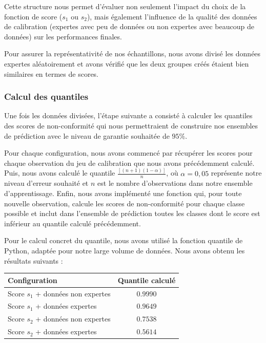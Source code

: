 \documentclass[a4paper,12pt]{article}
\begin{document}
\vspace{0.2cm}

Cette structure nous permet d'évaluer non seulement l'impact du choix de la fonction de score ($s_1$ ou $s_2$), mais également l'influence de la qualité des données de calibration (expertes avec peu de données ou non expertes avec beaucoup de données) sur les performances finales.

\vspace{0.2cm}

Pour assurer la représentativité de nos échantillons, nous avons divisé les données expertes aléatoirement et avons vérifié que les deux groupes créés étaient bien similaires en termes de scores.

\subsubsection{Calcul des quantiles}

Une fois les données divisées, l'étape suivante a consisté à calculer les quantiles des scores de non-conformité qui nous permettraient de construire nos ensembles de prédiction avec le niveau de garantie souhaitée de $95\%$.

\vspace{0.2cm}

Pour chaque configuration, nous avons commencé par récupérer les scores pour chaque observation du jeu de calibration que nous avons précédemment calculé. Puis, nous avons calculé le quantile $\frac{[(n+1)(1 - \alpha)]}{n}$, où $\alpha = 0,05$ représente notre niveau d'erreur souhaité et $n$ est le nombre d'observations dans notre ensemble d'apprentissage. Enfin, nous avons implémenté une fonction qui, pour toute nouvelle observation, calcule les scores de non-conformité pour chaque classe possible et inclut dans l'ensemble de prédiction toutes les classes dont le score est inférieur au quantile calculé précédemment.

\vspace{0.2cm}

Pour le calcul concret du quantile, nous avons utilisé la fonction quantile de Python, adaptée pour notre large volume de données. Nous avons obtenu les résultats suivants : 

\begin{center}
    \begin{tabular}{|l|c|}
        \hline
        Configuration & Quantile calculé \\
        \hline
        Score $s_1$ + données non expertes & $0.9990$ \\
        Score $s_1$ + données expertes & $0.9649$ \\
        Score $s_2$ + données non expertes & $0.7538$ \\
        Score $s_2$ + données expertes & $0.5614$ \\
        \hline
        \end{tabular}
    \end{center}
\end{document}
